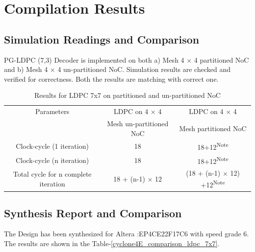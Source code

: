  \section{Compilation Results}
 \subsection{Simulation Readings and Comparison}
PG-LDPC (7,3) Decoder is implemented on both a) Mesh 4 $\times$ 4 partitioned NoC and b) Mesh 4 $\times$ 4 un-partitioned NoC. Simulation results are checked and verified for correctness. Both the results are matching with correct one.

\begin{table} [H]
\caption{Results for LDPC 7x7 on partitioned and un-partitioned NoC}
\begin{center}
\begin{tabular}{||c || c| c ||} \hline
	Parameters 			      	& LDPC on 4 $\times$ 4      	& LDPC on 4 $\times$ 4 					\\ [0.5ex]
						& Mesh un-partitioned NoC 	& Mesh partitioned NoC  				\\ \hline
	Clock-cycle (1 iteration) 	      	& 18 				& 18+12\textsuperscript{Note}				\\ \hline
	Clock-cycle (n iteration) 	      	& 18 				& 18+12\textsuperscript{Note}				\\ \hline
	Total cycle for n complete iteration 	& 18 + (n-1) $\times$ 12 	& (18 + (n-1) $\times$ 12) +12\textsuperscript{Note} 	\\ \hline
\end{tabular}
\end{center}
\label{ldpc_7x7_results}
\end{table}

 \subsection{Synthesis Report and Comparison}
 The Design has been synthesized for Altera :EP4CE22F17C6 with speed grade 6.
 The results are shown in the Table-\ref{cyclone4E_comparison_ldpc_7x7}.

